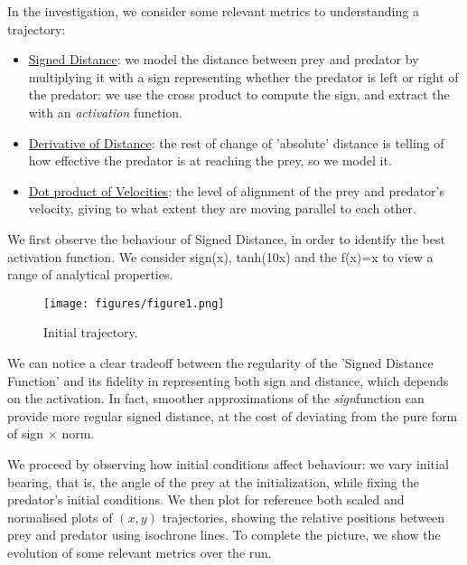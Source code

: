 \documentclass[11pt]{article}
\begin{document}
            In the investigation, we consider some relevant metrics to understanding a trajectory:
            \begin{itemize}
              \item \underline{Signed Distance}: we model the distance between prey and predator by multiplying it with a sign representing whether the predator is left or right of the predator: we use the cross product to compute the sign, and extract the with an \textit{activation} function.
              \item \underline{Derivative of Distance}: the rest of change of 'absolute' distance is telling of how effective the predator is at reaching the prey, so we model it.
              \item \underline{Dot product of Velocities}: the level of alignment of the prey and predator's velocity, giving to what extent they are moving parallel to each other.
            \end{itemize}

            We first observe the behaviour of Signed Distance, in order to identify the best activation function. We consider sign(x), tanh(10x) and the f(x)=x to view a range of analytical properties.

            \begin{figure}[htbp]
              \centering
              \texttt{[image: figures/figure1.png]}
              \caption{Initial trajectory.}
              \label{fig:trajectory}
            \end{figure}

            We can notice a clear tradeoff between the regularity of the 'Signed Distance Function' and its fidelity in representing both sign and distance, which depends on the activation. In fact, smoother approximations of the \textit{sign}function can provide more regular signed distance, at the cost of deviating from the pure form of sign $\times$ norm.

            We proceed by observing how initial conditions affect behaviour: we vary initial bearing, that is, the angle of the prey at the initialization, while fixing the predator's initial conditions. We then plot for reference both scaled and normalised plots of $(x,y)$ trajectories, showing the relative positions between prey and predator using isochrone lines. To complete the picture, we show the evolution of some relevant metrics over the run.
\end{document}
